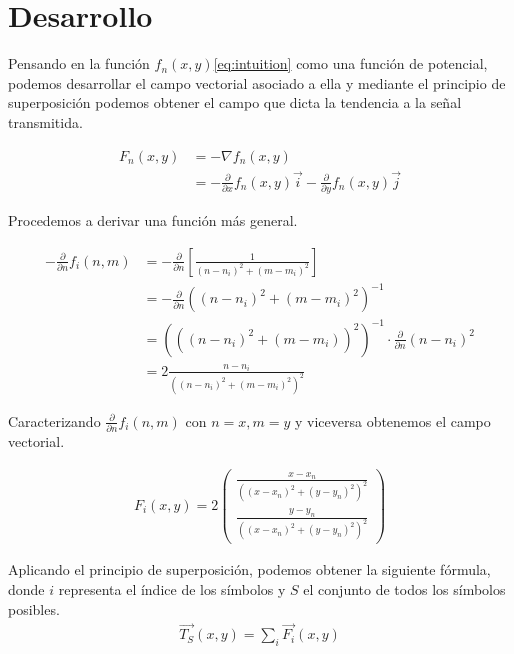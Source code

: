 \documentclass{article}
\newcommand{\partder}[1]{\frac{\partial}{\partial #1}}
\begin{document}
\section{Desarrollo}
Pensando en la función $f_n(x,y)$\ref{eq:intuition} como una función de
potencial, podemos desarrollar el campo vectorial asociado a ella y
mediante el principio de superposición podemos obtener el campo que
dicta la tendencia a la señal transmitida.

\begin{align}
  \label{eq:development}
  F_n\left( x, y \right) &= -\nabla f_n\left( x, y \right)\\
  &= - \partder{x} f_n \left( x, y \right) \vec{i} - \partder{y} f_n \left( x, y \right) \vec{j}
\end{align}

Procedemos a derivar una función más general.

\begin{align}
  \label{eq:derivative}
  - \partder{n} f_i \left( n, m \right) &= - \partder{n} \left[ \frac{1}{\left( n - n_i \right)^2 + \left( m - m_i \right)^2 } \right]\\
  &= - \partder{n} \left( \left( n - n_i \right)^2 + \left( m - m_i \right)^2 \right)^{-1}\\
  &= \left( \left( \left( n - n_i \right)^2 + \left( m - m_i \right) \right)^2 \right)^{-1} \cdot \partder{n}\left( n - n_i \right)^2\\
  &= 2 \frac{n - n_i}{\left( \left( n - n_i \right)^2 + \left( m - m_i \right)^2 \right)^2}
\end{align}

Caracterizando $\partder{n}f_i\left( n, m \right)$ con $n = x, m = y$ y viceversa
obtenemos el campo vectorial.

\begin{align}
  \label{eq:development2}
  F_i(x,y) = 2 \left(
  \begin{array}{c}
    \frac{x - x_n}{\left( \left( x - x_n \right)^2 + \left( y - y_n \right)^2\right)^2}\\
    \frac{y - y_n}{\left( \left( x - x_n \right)^2 + \left( y - y_n \right)^2\right)^2}
  \end{array}
  \right)
\end{align}

Aplicando el principio de superposición, podemos obtener la siguiente fórmula,
donde $i$ representa el índice de los símbolos y $S$ el conjunto de todos los
símbolos posibles.
\begin{align}
  \label{eq:superposition}
  \vec{T_S}(x,y) = \sum\limits_{i} \vec{F_i}\left( x, y\right)
\end{align}
\end{document}
